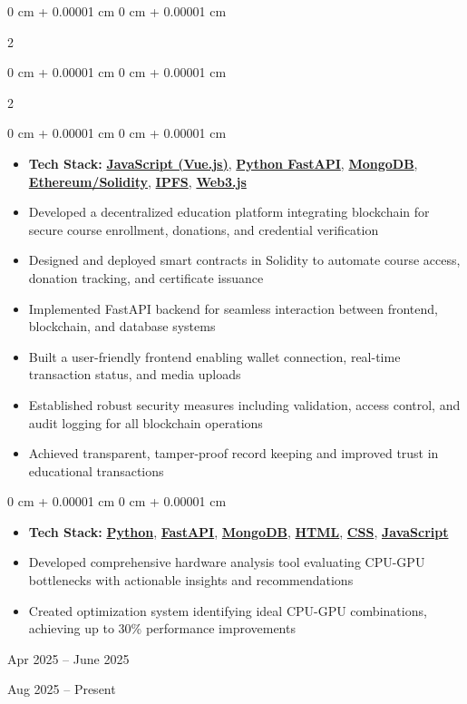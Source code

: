 \documentclass[10pt, letterpaper]{article}
\newenvironment{highlights}{
    \begin{itemize}[
        topsep=0.03 cm, %
        parsep=0.03 cm, %
        partopsep=0pt,
        itemsep=0pt,
        leftmargin=0 cm + 10pt
    ]
}{
    \end{itemize}
} %
\newenvironment{onecolentry}{
    \begin{adjustwidth}{
        0 cm + 0.00001 cm
    }{
        0 cm + 0.00001 cm
    }
}{
    \end{adjustwidth}
} %
\newenvironment{twocolentry}[2][]{
    \onecolentry
    \def\secondColumn{#2}
    \setcolumnwidth{\fill, 4.5 cm}
    \begin{paracol}{2}
}{
    \switchcolumn \raggedleft \secondColumn
    \end{paracol}
    \endonecolentry
} %
\begin{document}
\begin{twocolentry}{
            Aug 2025 – Present
        }
\begin{twocolentry}{
            Apr 2025 – June 2025
        }
        \vspace{0.05 cm}
        \begin{onecolentry}
            \begin{highlights}
                \item \textbf{Tech Stack:} \href{https://vuejs.org/}{\textbf{JavaScript (Vue.js)}}, \href{https://fastapi.tiangolo.com/}{\textbf{Python FastAPI}}, \href{https://www.mongodb.com/}{\textbf{MongoDB}}, \href{https://ethereum.org/}{\textbf{Ethereum/Solidity}}, \href{https://ipfs.tech/}{\textbf{IPFS}}, \href{https://web3js.readthedocs.io/}{\textbf{Web3.js}}
                \item Developed a decentralized education platform integrating blockchain for secure course enrollment, donations, and credential verification
                \item Designed and deployed smart contracts in Solidity to automate course access, donation tracking, and certificate issuance
                \item Implemented FastAPI backend for seamless interaction between frontend, blockchain, and database systems
                \item Built a user-friendly frontend enabling wallet connection, real-time transaction status, and media uploads
                \item Established robust security measures including validation, access control, and audit logging for all blockchain operations
                \item Achieved transparent, tamper-proof record keeping and improved trust in educational transactions
            \end{highlights}
        \end{onecolentry}
        \vspace{0.05 cm}
        \begin{onecolentry}
            \begin{highlights}
                \item \textbf{Tech Stack:} \href{https://www.python.org/}{\textbf{Python}}, \href{https://fastapi.tiangolo.com/}{\textbf{FastAPI}}, \href{https://www.mongodb.com/}{\textbf{MongoDB}}, \href{https://developer.mozilla.org/en-US/docs/Web/HTML}{\textbf{HTML}}, \href{https://developer.mozilla.org/en-US/docs/Web/CSS}{\textbf{CSS}}, \href{https://developer.mozilla.org/en-US/docs/Web/JavaScript}{\textbf{JavaScript}}
                \item Developed comprehensive hardware analysis tool evaluating CPU-GPU bottlenecks with actionable insights and recommendations
                \item Created optimization system identifying ideal CPU-GPU combinations, achieving up to 30\% performance improvements
            \end{highlights}
        \end{onecolentry}


\end{twocolentry}
\end{twocolentry}
\end{document}
